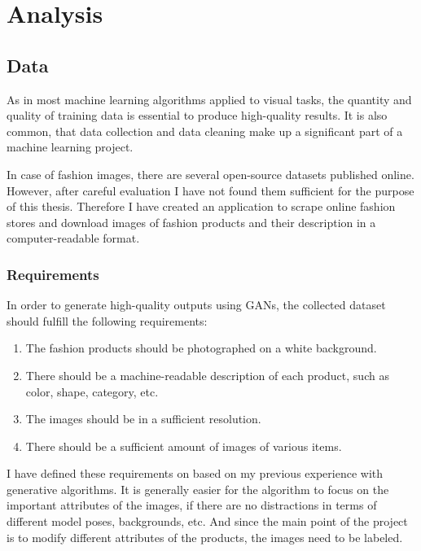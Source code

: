 \documentclass{article}
\begin{document}
\pagebreak
\section{Analysis}

\subsection{Data} \label{sec:data}
As in most machine learning algorithms applied to visual tasks, the quantity and quality of training data is essential to produce high-quality results. It is also common, that data collection and data cleaning make up a significant part of a machine learning project.

In case of fashion images, there are several open-source datasets published online. However, after careful evaluation I have not found them sufficient for the purpose of this thesis. Therefore I have created an application to scrape online fashion stores and download images of fashion products and their description in a computer-readable format.

\subsubsection{Requirements}

In order to generate high-quality outputs using GANs, the collected dataset should fulfill the following requirements:
\begin{enumerate}
\item The fashion products should be photographed on a white background. 
\item There should be a machine-readable description of each product, such as color, shape, category, etc. 
\item The images should be in a sufficient resolution.
\item There should be a sufficient amount of images of various items.

\end{enumerate}
I have defined these requirements on based on my previous experience with generative algorithms. It is generally easier for the algorithm to focus on the important attributes of the images, if there are no distractions in terms of different model poses, backgrounds, etc. And since the main point of the project is to modify different attributes of the products, the images need to be labeled.
\end{document}
